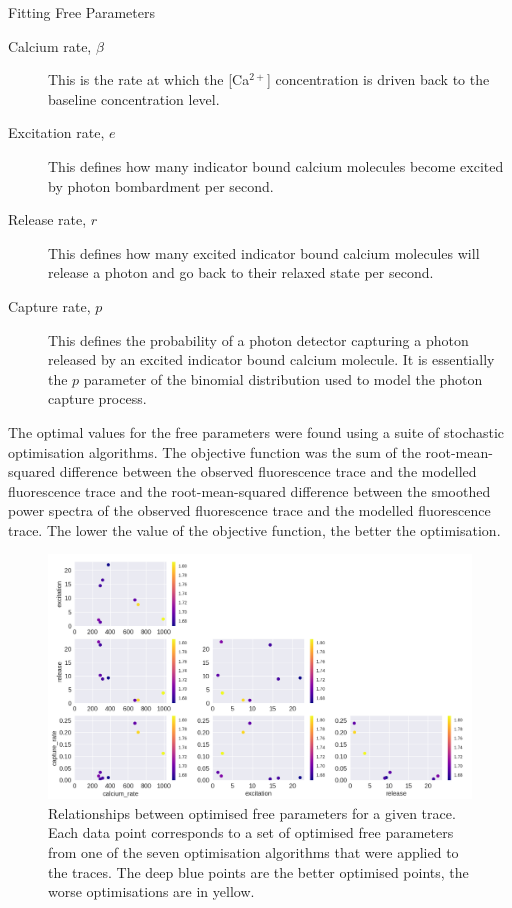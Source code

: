 \documentclass[final]{beamer}
\newlength{\onecolwid}
\begin{document}
\begin{frame}[t]
\begin{columns}[t]
\begin{column}{\onecolwid}
\begin{block}{Fitting Free Parameters}
\begin{description}
	\item[Calcium rate, $\beta$] This is the rate at which the [Ca$^{2+}$] concentration is driven back to the baseline \cite{maravall} concentration level.
	\item[Excitation rate, $e$] This defines how many indicator bound calcium molecules become excited by photon bombardment per second.
	\item[Release rate, $r$] This defines how many excited indicator bound calcium molecules will release a photon and go back to their relaxed state per second.
	\item[Capture rate, $p$] This defines the probability of a photon detector capturing a photon released by an excited indicator bound calcium molecule. It is essentially the $p$ parameter of the binomial distribution used to model the photon capture process.
\end{description}

The optimal values for the free parameters were found using a suite of stochastic optimisation algorithms. The objective function was the sum of the root-mean-squared difference between the observed fluorescence trace and the modelled fluorescence trace and the root-mean-squared difference between the smoothed power spectra of the observed fluorescence trace and the modelled fluorescence trace. The lower the value of the objective function, the better the optimisation.

\vspace{5mm}
\begin{figure}
	\includegraphics[width=\linewidth]{opcc_18.png}
	\caption{Relationships between optimised free parameters for a given trace. Each data point corresponds to a set of optimised free parameters from one of the seven optimisation algorithms that were applied to the traces. The deep blue points are the better optimised points, the worse optimisations are in yellow.}
\end{figure}
\end{block}


\end{column}
\end{columns}
\end{frame}
\end{document}
